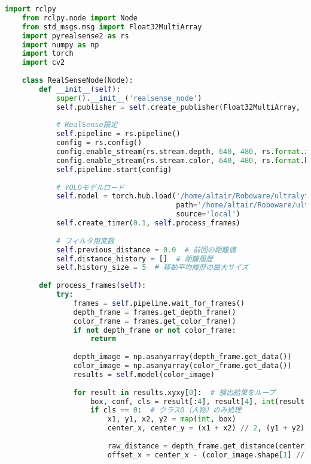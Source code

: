 \begin{lstlisting}[language=Python, caption=RealSense\_node.py]
    import rclpy
    from rclpy.node import Node
    from std_msgs.msg import Float32MultiArray
    import pyrealsense2 as rs
    import numpy as np
    import torch
    import cv2
    
    class RealSenseNode(Node):
        def __init__(self):
            super().__init__('realsense_node')
            self.publisher = self.create_publisher(Float32MultiArray, 'camera_data', 10)
    
            # RealSense設定
            self.pipeline = rs.pipeline()
            config = rs.config()
            config.enable_stream(rs.stream.depth, 640, 480, rs.format.z16, 30)
            config.enable_stream(rs.stream.color, 640, 480, rs.format.bgr8, 30)
            self.pipeline.start(config)
    
            # YOLOモデルロード
            self.model = torch.hub.load('/home/altair/Roboware/ultralytics/yolov5', 'custom', 
                                        path='/home/altair/Roboware/ultralytics/yolov5/yolov5s.pt', 
                                        source='local')
            self.create_timer(0.1, self.process_frames)
    
            # フィルタ用変数
            self.previous_distance = 0.0  # 前回の距離値
            self.distance_history = []  # 距離履歴
            self.history_size = 5  # 移動平均履歴の最大サイズ
    
        def process_frames(self):
            try:
                frames = self.pipeline.wait_for_frames()
                depth_frame = frames.get_depth_frame()
                color_frame = frames.get_color_frame()
                if not depth_frame or not color_frame:
                    return
    
                depth_image = np.asanyarray(depth_frame.get_data())
                color_image = np.asanyarray(color_frame.get_data())
                results = self.model(color_image)
    
                for result in results.xyxy[0]:  # 検出結果をループ
                    box, conf, cls = result[:4], result[4], int(result[5])
                    if cls == 0:  # クラス0（人物）のみ処理
                        x1, y1, x2, y2 = map(int, box)
                        center_x, center_y = (x1 + x2) // 2, (y1 + y2) // 2
    
                        raw_distance = depth_frame.get_distance(center_x, center_y)
                        offset_x = center_x - (color_image.shape[1] // 2)
    

\end{lstlisting}
